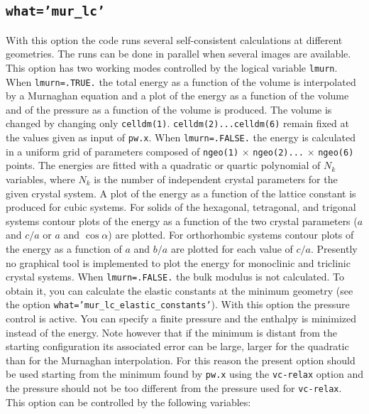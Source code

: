 \documentclass[12pt,a4paper]{article}
\begin{document}
\subsection{\color{web-blue}\texttt{what='mur\_lc'}}
With this option the code runs several self-consistent calculations
at different geometries. The runs can be done in parallel when several images 
are available. This option has two working modes controlled by the 
logical variable \texttt{lmurn}. When \texttt{lmurn=.TRUE.} the total energy as 
a function of the volume is interpolated by a Murnaghan equation and 
a plot of the energy as a function of the volume and of the pressure 
as a function of the volume is produced. The volume is changed by 
changing only \texttt{celldm(1)}. \texttt{celldm(2)...celldm(6)} remain fixed
at the values given as input of \texttt{pw.x}.
When \texttt{lmurn=.FALSE.} the energy is calculated in a uniform
grid of parameters composed of \texttt{ngeo(1)} $\times$ \texttt{ngeo(2)...}
$\times$ \texttt{ngeo(6)} points.
The energies are fitted with a quadratic or quartic polynomial of
$N_k$ variables, where $N_k$ is the number of independent crystal
parameters for the given crystal system. A plot of the energy as 
a function of the lattice constant is produced for cubic systems.
For solids of the hexagonal, tetragonal, and trigonal systems
contour plots of the energy as a function of the two crystal parameters
($a$ and $c/a$ or $a$ and $\cos\alpha$)
are plotted. For orthorhombic systems contour plots of the energy as a function
of $a$ and $b/a$ are plotted for each value of $c/a$. 
Presently no graphical tool is implemented to plot the energy
for monoclinic and triclinic crystal systems. 
When \texttt{lmurn=.FALSE.} the bulk modulus
is not calculated. To obtain it, you can calculate the elastic constants at the
minimum geometry (see the option \texttt{what='mur\_lc\_elastic\_constants'}). 
With this option the pressure control is active. You can specify a 
finite pressure and the enthalpy is minimized instead of the
energy. Note however that if the minimum is distant from the starting
configuration its associated error can be large, larger for the
quadratic than for the Murnaghan interpolation. For this
reason the present option should be used starting from the minimum found by
\texttt{pw.x} using the \texttt{vc-relax} option and the pressure 
should not be too different from the pressure used for \texttt{vc-relax}.\\
This option can be controlled by the following variables:
\end{document}
